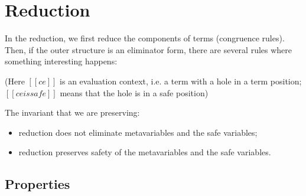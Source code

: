 \documentclass[acmsmall,natbib=false,review,anonymous]{acmart}
\begin{document}
    \ottdefnOkInertLabeled{}
\newpage

\section{Reduction}
  \label{sec:red}
  
  In the reduction, we first reduce the
  components of terms (congruence rules).
  Then, if the outer structure is an eliminator form,
  there are several rules where something interesting happens:
  \begin{ottdefnblock}[]{\ottdefnHeaderRedRed}{}
    \ottusedrule{\ottdruleRedRedAppLamLabeled[]{}}
    \ottusedrule{\ottdruleRedRedAppPLamLabeled[]{}}
    \ottusedrule{\ottdruleRedRedLRedSafeLabeled[]{}}
    \ottusedrule{\ottdruleRedRedLRedNeutLabeled[]{}}
    \ottusedrule{\ottdruleRedRedLRedGrLabeled[]{}}
    \ottusedrule{\ottdruleRedRedLNotinLabeled[]{}}
  \end{ottdefnblock}
  (Here $[[ce]]$ is an evaluation context, i.e. a term with a hole 
  in a term position; $[[ce is safe]]$ means that the hole is in a safe position)

  The invariant that we are preserving:
  \begin{itemize}
    \item reduction does not eliminate metavariables and the safe variables;
    \item reduction preserves safety of the metavariables and the safe variables.
  \end{itemize}


\subsection{Properties}

\begin{lemma}
\end{lemma}
\end{document}
